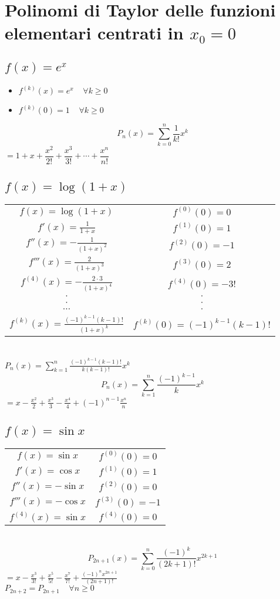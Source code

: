 \section{Polinomi di Taylor delle funzioni elementari centrati in $x_0=0$}
\subsection{$f(x)=e^x$}
\begin{itemize}
\item $f^{(k)}(x)=e^x\;\;\;\;\forall k\ge 0$
\item $f^{(k)}(0)=1\;\;\;\;\forall k\ge 0$
\end{itemize}
\begin{equation}
P_n(x)=\sum\limits_{k=0}^n\dfrac{1}{k!}x^k
\end{equation}
$=1+x+\dfrac{x^2}{2!}+\dfrac{x^3}{3!}+\cdots+\dfrac{x^n}{n!}$
\subsection{$f(x)=\log (1+x)$}
\begin{tabular}{c c}
$f(x)=\log (1+x)$ & $f^{(0)}(0)=0$\\
$f'(x)=\frac{1}{1+x}$ & $f^{(1)}(0)=1$\\
$f''(x)=-\frac{1}{(1+x)^2}$ & $f^{(2)}(0)=-1$\\
$f'''(x)=\frac{2}{(1+x)^3}$ & $f^{(3)}(0)=2$\\
$f^{(4)}(x)=-\frac{2\cdot3}{(1+x)^4}$ & $f^{(4)}(0)=-3!$\\
$\cdot$ & $\cdot$\\
$\cdot$ & $\cdot$\\
$\cdots$ & $\cdot$\\
$f^{(k)}(x)=\frac{(-1)^{k-1}(k-1)!}{(1+x)^k}$ & $f^{(k)}(0)=(-1)^{k-1}(k-1)!$\\
\end{tabular}\\
$P_n(x)=\sum\limits_{k=1}^n\frac{(-1)^{k-1}(k-1)!}{k(k-1)!}x^k$
\begin{equation}
P_n(x)=\sum\limits_{k=1}^n\dfrac{(-1)^{k-1}}{k}x^k
\end{equation}
$=x-\frac{x^2}{2}+\frac{x^3}{3}-\frac{x^4}{4}+(-1)^{n-1}\frac{x^n}{n}$
\subsection{$f(x)=\sin x$}
\begin{tabular}{c c}
$f(x)=\sin x$ & $f^{(0)}(0)=0$\\
$f'(x)=\cos x$ & $f^{(1)}(0)=1$\\
$f''(x)=-\sin x$ & $f^{(2)}(0)=0$\\
$f'''(x)=-\cos x$ & $f^{(3)}(0)=-1$\\
$f^{(4)}(x)=\sin x$ & $f^{(4)}(0)=0$\\
\end{tabular}\\
\begin{equation}
P_{2n+1}(x)=\sum\limits_{k=0}^n\dfrac{(-1)^{k}}{(2k+1)!}x^{2k+1}
\end{equation}
$=x-\frac{x^3}{3!}+\frac{x^5}{5!}-\frac{x^7}{7!}+\frac{(-1)^{n}x^{2n+1}}{(2n+1)!}$\\
$P_{2n+2}=P_{2n+1}\;\;\;\;\forall n\ge 0$
